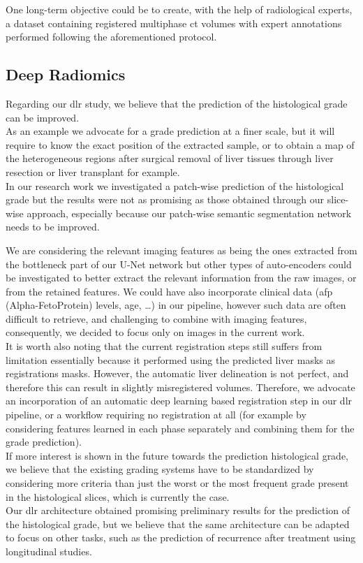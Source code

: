 One long-term objective could be to create, with the help of
radiological experts, a dataset containing registered multiphase \ac{ct}
volumes with expert annotations performed following the aforementioned
protocol.

\subsection{Deep Radiomics}

Regarding our \ac{dlr} study, we believe that the prediction of the
histological grade can be improved. \\
As an example we advocate for a grade prediction at a finer
scale, but it will require to know the exact position of the extracted
sample, or to obtain a map of the heterogeneous regions after surgical
removal of liver tissues through liver resection or liver transplant for
example.\\
In our research work we investigated a patch-wise prediction of the
histological grade but the results were not as promising as those
obtained through our slice-wise approach, especially because our
patch-wise semantic segmentation network needs to be improved.

We are considering the relevant imaging features as being the
ones extracted from the bottleneck part of our U-Net network but other
types of auto-encoders could be investigated to better
extract the relevant information from the raw images, or from the
retained features. We could have also incorporate clinical
data (\ac{afp} (Alpha-FetoProtein) levels, age, \ldots{}) in our pipeline, however such data are
often difficult to retrieve, and challenging to combine with imaging
features, consequently, we decided to focus only on images in the
current work.\\
It is worth also noting that the current registration steps still suffers from limitation
essentially because it performed using the predicted liver masks as registrations masks. However, the automatic liver delineation is not perfect, and therefore this can result in slightly misregistered volumes. Therefore, we advocate an incorporation of an automatic deep learning based registration step in our \ac{dlr} pipeline, or a workflow requiring no registration at all (for example by considering features learned in each phase separately and combining them for the grade prediction).\\
If more interest is shown in the future towards the prediction
histological grade, we believe that the existing grading systems have to
be standardized by considering more criteria than just the worst or the
most frequent grade present in the histological slices, which is
currently the case.\\
Our \ac{dlr} architecture obtained promising preliminary results for the prediction of
the histological grade, but we believe that the same architecture can be
adapted to focus on other tasks, such as the prediction of
recurrence after treatment using longitudinal studies.

